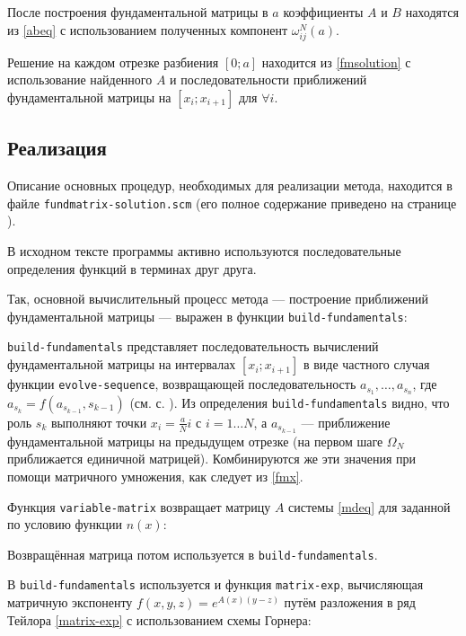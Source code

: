 \documentclass{article}
\newcommand{\filename}[1]{\texttt{#1}}
\newcommand{\procname}[1]{\texttt{#1}}
\numberwithin{equation}{section}
\begin{document}
После построения фундаментальной матрицы в $a$ коэффициенты $A$ и $B$
находятся из \eqref{abeq} с использованием полученных компонент
$\omega_{ij}^N(a)$.

Решение на каждом отрезке разбиения $[0; a]$ находится из
\eqref{fmsolution} с использование найденного $A$ и последовательности
приближений фундаментальной матрицы на $[x_i; x_{i+1}]$ для $\forall
i$.

\clearpage
\subsection{Реализация}

Описание основных процедур, необходимых для реализации метода,
находится в файле \filename{fundmatrix-solution.scm} (его полное содержание
приведено на странице \pageref{fundmatrix-solution.scm-full-listing}).

В исходном тексте программы активно используются последовательные
определения функций в терминах друг друга.

Так, основной вычислительный процесс метода — построение приближений
фундаментальной матрицы — выражен в функции
\procname{build-fundamentals}:



\procname{build-fundamentals} представляет последовательность вычислений
фундаментальной матрицы на интервалах $[x_i; x_{i+1}]$ в виде частного
случая функции \procname{evolve-sequence}, возвращающей
последовательность $a_{s_1}, \dotsc, a_{s_n}$, где $a_{s_k} =
f(a_{s_{k-1}}, s_{k-1})$
(см. с. \pageref{shared.scm-full-listing}). Из определения
\procname{build-fundamentals} видно, что роль $s_k$ выполняют точки $x_i
= \frac{a}{N}i$ с $i = 1 \ldots N$, а $a_{s_{k-1}}$ — приближение
фундаментальной матрицы на предыдущем отрезке (на первом шаге
$\Omega_N$ приближается единичной матрицей). Комбинируются же эти
значения при помощи матричного умножения, как следует из \eqref{fmx}.

Функция \procname{variable-matrix} возвращает матрицу $A$ системы
\eqref{mdeq} для заданной по условию функции $n(x)$:



Возвращённая матрица потом используется в \procname{build-fundamentals}.

В \procname{build-fundamentals} используется и функция
\procname{matrix-exp}, вычисляющая матричную
экспоненту $f(x, y, z) = e^{A(x)(y-z)}$ путём разложения в ряд Тейлора
\eqref{matrix-exp} с использованием схемы Горнера:
\end{document}
